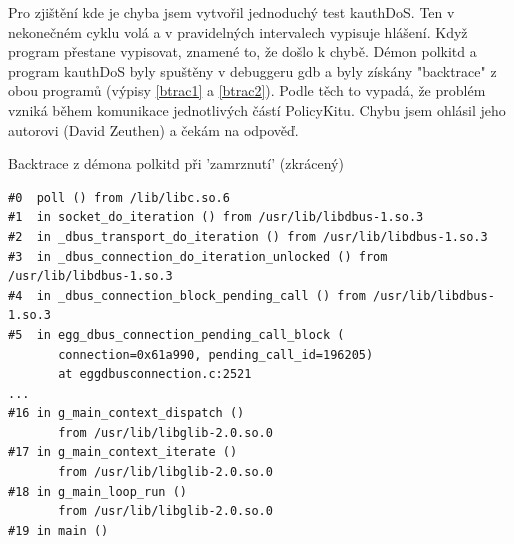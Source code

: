 {Pro zjištění kde je chyba jsem vytvořil jednoduchý test kauthDoS. Ten v nekonečném cyklu volá  a v pravidelných intervalech vypisuje hlášení. Když program přestane vypisovat, znamené to, že došlo k chybě. Démon polkitd a program kauthDoS byly spuštěny v debuggeru gdb a byly získány "backtrace" z obou programů (výpisy \ref{btrac1} a \ref{btrac2}). Podle těch to vypadá, že problém vzniká během komunikace jednotlivých částí PolicyKitu. Chybu jsem ohlásil jeho autorovi (David Zeuthen) a čekám na odpověď.

\begin{mylisting}
\caption{Backtrace z démona polkitd při 'zamrznutí' (zkrácený)}
\label{btrac1}
\begin{lstlisting}
#0  poll () from /lib/libc.so.6
#1  in socket_do_iteration () from /usr/lib/libdbus-1.so.3
#2  in _dbus_transport_do_iteration () from /usr/lib/libdbus-1.so.3
#3  in _dbus_connection_do_iteration_unlocked () from /usr/lib/libdbus-1.so.3
#4  in _dbus_connection_block_pending_call () from /usr/lib/libdbus-1.so.3
#5  in egg_dbus_connection_pending_call_block (
       connection=0x61a990, pending_call_id=196205)
       at eggdbusconnection.c:2521
...      
#16 in g_main_context_dispatch ()
       from /usr/lib/libglib-2.0.so.0
#17 in g_main_context_iterate ()
       from /usr/lib/libglib-2.0.so.0
#18 in g_main_loop_run ()
       from /usr/lib/libglib-2.0.so.0
#19 in main ()
\end{lstlisting}
\end{mylisting}

}
